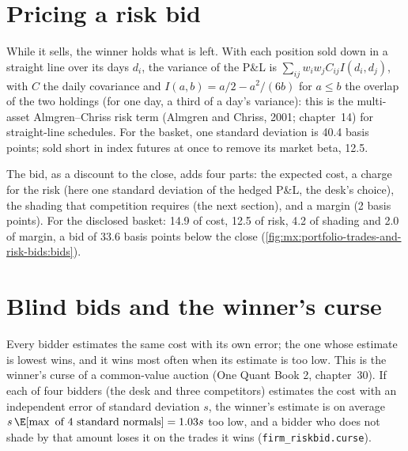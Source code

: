 \section{Pricing a risk bid}

While it sells, the winner holds what is left. With each position sold down in a straight line over its days $d_i$, the variance of the P\&L is
$\sum_{ij}w_iw_jC_{ij}I(d_i,d_j)$, with $C$ the daily covariance and $I(a,b)=a/2-a^2/(6b)$ for $a\le b$ the overlap of the two holdings (for one day,
a third of a day's variance): this is the multi-asset Almgren--Chriss risk term (Almgren and Chriss, 2001; chapter~14) for straight-line schedules. For
the basket, one standard deviation is 40.4 basis points; sold short in index futures at once to remove its market beta, 12.5.

\label{lst:mx:portfolio-trades-and-risk-bids:risk}

The bid, as a discount to the close, adds four parts: the expected cost, a charge for the risk (here one standard deviation of the hedged P\&L, the
desk's choice), the shading that competition requires (the next section), and a margin (2 basis points). For the disclosed basket: 14.9 of cost,
12.5 of risk, 4.2 of shading and 2.0 of margin, a bid of 33.6 basis points below the close (\cref{fig:mx:portfolio-trades-and-risk-bids:bids}).

\section{Blind bids and the winner's curse}

Every bidder estimates the same cost with its own error; the one whose estimate is lowest wins, and it wins most often when its estimate is too low.
This is the winner's curse of a common-value auction (One Quant Book 2, chapter~30). If each of four bidders (the desk and three competitors) estimates
the cost with an independent error of standard deviation $s$, the winner's estimate is on average $s\,\E[\max\text{ of 4 standard normals}]=1.03s$
too low, and a bidder who does not shade by that amount loses it on the trades it wins (\texttt{firm\_riskbid.curse}).

\label{lst:mx:portfolio-trades-and-risk-bids:curse}

